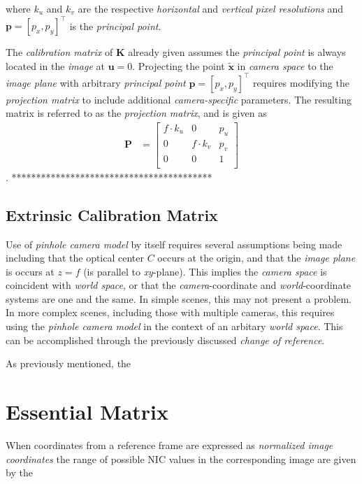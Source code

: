 where $k_u$ and $k_v$ are the respective \textit{horizontal} and \textit{vertical} \textit{pixel resolutions} and $\mathbf{p}=[p_x,p_y]^\intercal$ is the \textit{principal point}. 


\par The \textit{calibration matrix} of $\mathbf{K}$ already given assumes the \textit{principal point} is always located in the \textit{image} at $\mathbf{u}=0$. Projecting the point $\mathbf{\tilde{x}}$ in \textit{camera space} to the \textit{image plane} with arbitrary \textit{principal point} $\mathbf{p}=[p_x,p_y]^\intercal$ requires modifying the \textit{projection matrix} to include additional \textit{camera-specific} parameters. The resulting matrix is referred to as the \textit{projection matrix}, and is given as
\begin{equation*}
\begin{split}
\mathbf{P}&=
\begin{bmatrix}
f\cdot k_u & 0 & p_u\\
0 & f\cdot k_v & p_v\\
0 & 0 & 1\\
\end{bmatrix}
\end{split}
\end{equation*}.
*****************************************\\


\subsection{Extrinsic Calibration Matrix}
\par Use of \textit{pinhole camera model} by itself requires several assumptions being made including that the optical center $C$ occurs at the origin, and that the \textit{image plane} is occurs at $z=f$ (is parallel to \textit{xy}-plane). This implies the \textit{camera space} is coincident with \textit{world space}, or that the \textit{camera}-coordinate and \textit{world}-coordinate systems are one and the same. In simple scenes, this may not present a problem. In more complex scenes, including those with multiple cameras, this requires using the \textit{pinhole camera model} in the context of an arbitary \textit{world space}. This can be accomplished through the previously discussed \textit{change of reference}.\newline
  
\par As previously mentioned, the
\section{Essential Matrix}

\par When coordinates from a reference frame are expressed as \textit{normalized image coordinates} the range of possible NIC values in the corresponding image are given by the 

